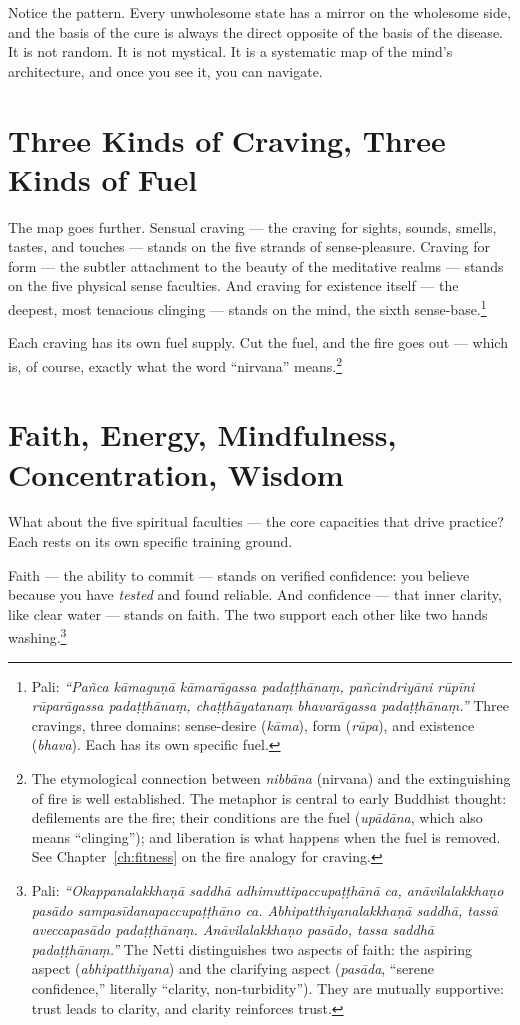 Notice the pattern. Every unwholesome state has a mirror on the wholesome side, and the basis of the cure is always the direct opposite of the basis of the disease. It is not random. It is not mystical. It is a systematic map of the mind's architecture, and once you see it, you can navigate.

\section*{Three Kinds of Craving, Three Kinds of Fuel}

The map goes further. Sensual craving --- the craving for sights, sounds, smells, tastes, and touches --- stands on the five strands of sense-pleasure. Craving for form --- the subtler attachment to the beauty of the meditative realms --- stands on the five physical sense faculties. And craving for existence itself --- the deepest, most tenacious clinging --- stands on the mind, the sixth sense-base.\footnote{Pali: \textit{``Pañca kāmaguṇā kāmarāgassa padaṭṭhānaṃ, pañcindriyāni rūpīni rūparāgassa padaṭṭhānaṃ, chaṭṭhāyatanaṃ bhavarāgassa padaṭṭhānaṃ.''} Three cravings, three domains: sense-desire (\textit{kāma}), form (\textit{rūpa}), and existence (\textit{bhava}). Each has its own specific fuel.}

Each craving has its own fuel supply. Cut the fuel, and the fire goes out --- which is, of course, exactly what the word ``nirvana'' means.\footnote{The etymological connection between \textit{nibbāna} (nirvana) and the extinguishing of fire is well established. The metaphor is central to early Buddhist thought: defilements are the fire; their conditions are the fuel (\textit{upādāna}, which also means ``clinging''); and liberation is what happens when the fuel is removed. See Chapter~\ref{ch:fitness} on the fire analogy for craving.}

\section*{Faith, Energy, Mindfulness, Concentration, Wisdom}

What about the five spiritual faculties --- the core capacities that drive practice? Each rests on its own specific training ground.

Faith --- the ability to commit --- stands on verified confidence: you believe because you have \textit{tested} and found reliable. And confidence --- that inner clarity, like clear water --- stands on faith. The two support each other like two hands washing.\footnote{Pali: \textit{``Okappanalakkhaṇā saddhā adhimuttipaccupaṭṭhānā ca, anāvilalakkhaṇo pasādo sampasīdanapaccupaṭṭhāno ca. Abhipatthiyanalakkhaṇā saddhā, tassā aveccapasādo padaṭṭhānaṃ. Anāvilalakkhaṇo pasādo, tassa saddhā padaṭṭhānaṃ.''} The Netti distinguishes two aspects of faith: the aspiring aspect (\textit{abhipatthiyana}) and the clarifying aspect (\textit{pasāda}, ``serene confidence,'' literally ``clarity, non-turbidity''). They are mutually supportive: trust leads to clarity, and clarity reinforces trust.}

